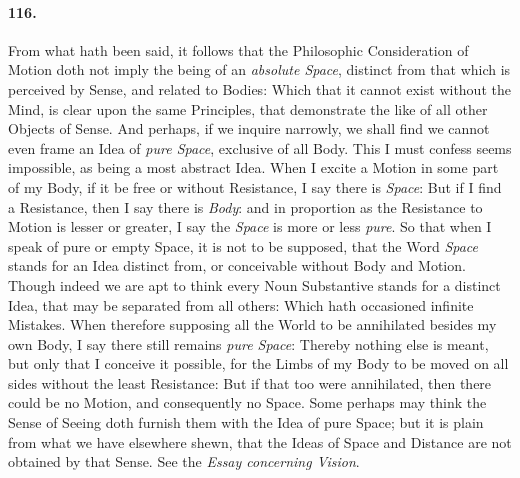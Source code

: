 \documentclass[]{article}
\newenvironment{sectionbody}{}{}
\begin{document}
\begin{sectionbody}
\paragraph{116.} From what hath been said, it follows that the Philosophic
Consideration of Motion doth not imply the being of an
\emph{absolute Space}, distinct from that which is perceived by
Sense, and related to Bodies: Which that it cannot exist without
the Mind, is clear upon the same Principles, that demonstrate the
like of all other Objects of Sense.  And perhaps, if we inquire
narrowly, we shall find we cannot even frame an Idea of \emph{pure
Space}, exclusive of all Body.  This I must confess seems
impossible, as being a most abstract Idea.  When I excite a
Motion in some part of my Body, if it be free or without
Resistance, I say there is \emph{Space}: But if I find a
Resistance, then I say there is \emph{Body}: and in proportion
as the Resistance to Motion is lesser or greater, I say the
\emph{Space} is more or less \emph{pure}.  So that when I
speak of pure or empty Space, it is not to be supposed, that the
Word \emph{Space} stands for an Idea distinct from, or
conceivable without Body and Motion.  Though indeed we are apt to
think every Noun Substantive stands for a distinct Idea, that may
be separated from all others: Which hath occasioned infinite
Mistakes.  When therefore supposing all the World to be
annihilated besides my own Body, I say there still remains
\emph{pure Space}: Thereby nothing else is meant, but only that
I conceive it possible, for the Limbs of my Body to be moved on
all sides without the least Resistance: But if that too were
annihilated, then there could be no Motion, and consequently no
Space.  Some perhaps may think the Sense of Seeing doth furnish
them with the Idea of pure Space; but it is plain from what we
have elsewhere shewn, that the Ideas of Space and Distance are
not obtained by that Sense.  See the \emph{Essay concerning
Vision}.




\end{sectionbody}
\end{document}

